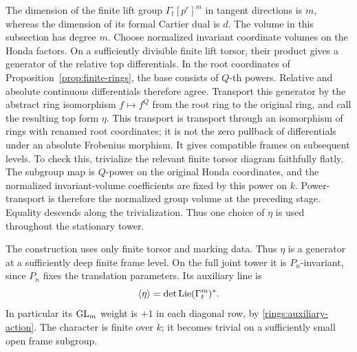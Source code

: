 The dimension of the finite lift group
$\Gamma_t[p^r]^m$ in tangent directions is $m$, whereas
the dimension of its formal Cartier dual is $d$.
The volume in this subsection has degree $m$.
Choose normalized invariant coordinate volumes on the
Honda factors.  On a sufficiently divisible finite
lift torsor, their product gives a generator of the
relative top differentials.  In the root coordinates
of Proposition~\ref{prop:finite-rings}, the base
consists of $Q$-th powers.  Relative and absolute
continuous differentials therefore agree.  Transport
this generator by the abstract ring isomorphism
$f\mapsto f^Q$ from the root ring to the original
ring, and call the resulting top form $\eta$.
This transport is transport through an isomorphism
of rings with renamed root coordinates; it is not
the zero pullback of differentials under an absolute
Frobenius morphism.
It gives compatible frames on subsequent levels.  To
check this, trivialize the relevant finite torsor
diagram faithfully flatly.  The subgroup map is
$Q$-power on the original Honda coordinates, and
the normalized invariant-volume coefficients are
fixed by this power on $k$.  Power-transport is
therefore the normalized group volume at the
preceding stage.  Equality descends along the
trivialization.  Thus one choice of $\eta$ is
used throughout the stationary tower.

The construction uses only finite torsor and marking
data.  Thus $\eta$ is a generator at a sufficiently
deep finite frame level.  On the full joint tower it
is $P_n$-invariant, since $P_n$ fixes the translation
parameters.  Its auxiliary line is
\begin{equation}\label{rings:volume-character}
 \langle\eta\rangle
    =\det\operatorname{Lie}(\Gamma_t^m)^*.
\end{equation}
In particular its $\operatorname{GL}_m$ weight is $+1$ in each
diagonal row, by \eqref{rings:auxiliary-action}.
The character is finite over $k$; it becomes trivial
on a sufficiently small open frame subgroup.

